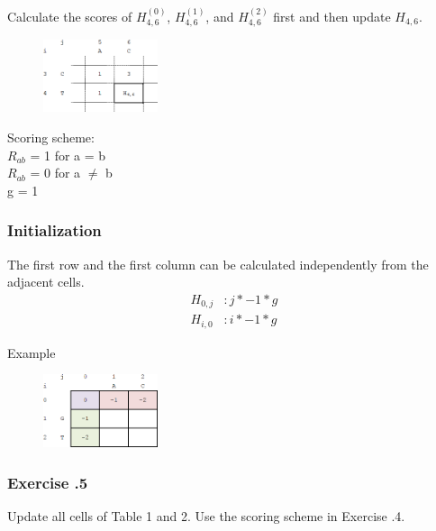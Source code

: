Calculate the scores of $H_{4,6}^{(0)}$, $H_{4,6}^{(1)}$, and $H_{4,6}^{(2)}$ first and then update $H_{4,6}$.
\begin{multicols}{2}
\begin{figure}[H]
  \centering
      \includegraphics[width=0.3\textwidth]{fig02/dynamic_programmoing_cell_update_exercise.png}
\end{figure}

\noindent Scoring scheme: \\ 
\null \quad $R_{ab}$ = 1 for a = b \\ 
\null \quad $R_{ab}$ = 0 for a $\neq$ b \\ 
\null \quad g = 1

\end{multicols} 

%
%
\subsubsection*{Initialization}

The first row and the first column can be calculated independently from the adjacent cells.
\begin{align*}
H_{0,j} &:  j * -1 * g \\
H_{i,0} &: i * -1 * g
\end{align*}

\noindent
Example
\begin{figure}[H]
  \centering
      \includegraphics[width=0.3\textwidth]{fig02/dynamic_programmoing_initialization.png}
\end{figure}

%
%
\subsubsection*{Exercise \thesection.5}
Update all cells of Table 1 and 2. Use the scoring scheme in Exercise \thesection.4.

